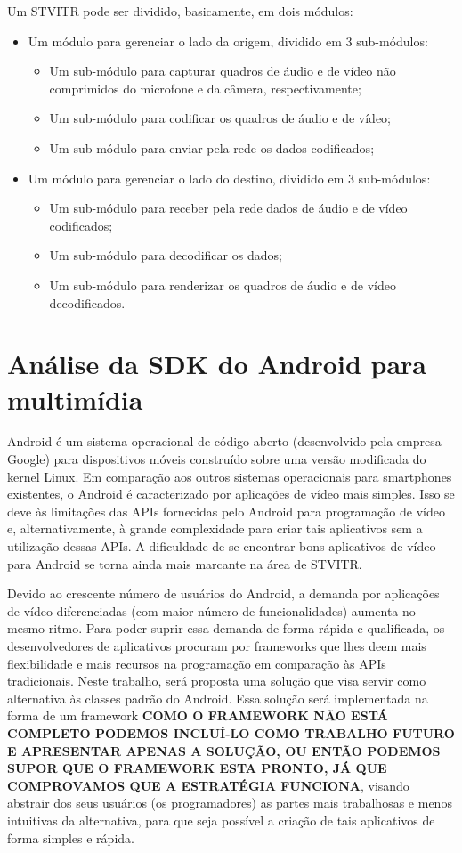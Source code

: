 \documentclass{acm_proc_article-sp}
\newcommand{\todo}[1]{\textcolor[rgb]{1.00,0.00,0.00}{\bf \uppercase{#1}}}
\begin{document}
Um STVITR pode ser dividido, basicamente, em dois módulos:
\begin{itemize}
 \item Um módulo para gerenciar o lado da origem, dividido em 3 sub-módulos:
 \begin{itemize}
  \item Um sub-módulo para capturar quadros de áudio e de vídeo não comprimidos do microfone e da câmera, respectivamente;
  \item Um sub-módulo para codificar os quadros de áudio e de vídeo;
  \item Um sub-módulo para enviar pela rede os dados codificados;
 \end{itemize}
 \item Um módulo para gerenciar o lado do destino, dividido em 3 sub-módulos:
 \begin{itemize}
  \item Um sub-módulo para receber pela rede dados de áudio e de vídeo codificados;
  \item Um sub-módulo para decodificar os dados;
  \item Um sub-módulo para renderizar os quadros de áudio e de vídeo decodificados.
 \end{itemize}
\end{itemize}

\section{Análise da SDK do Android para multimídia}

Android é um sistema operacional de código aberto (desenvolvido pela empresa Google) para dispositivos móveis construído sobre uma versão modificada do kernel Linux. Em comparação aos outros sistemas operacionais para smartphones existentes, o Android é caracterizado por aplicações de vídeo mais simples. Isso se deve às limitações das APIs fornecidas pelo Android para programação de vídeo e, alternativamente, à grande complexidade para criar tais aplicativos sem a utilização dessas APIs. A dificuldade de se encontrar bons aplicativos de vídeo para Android se torna ainda mais marcante na área de STVITR.

Devido ao crescente número de usuários do Android, a demanda por aplicações de vídeo diferenciadas (com maior número de funcionalidades) aumenta no mesmo ritmo. Para poder suprir essa demanda de forma rápida e qualificada, os desenvolvedores de aplicativos procuram por frameworks que lhes deem mais flexibilidade e mais recursos na programação em comparação às APIs tradicionais. Neste trabalho, será proposta uma solução que visa servir como alternativa às classes padrão do Android. Essa solução será implementada na forma de um framework \todo{como o framework não está completo podemos incluí-lo como trabalho futuro e apresentar apenas a solução, ou então podemos supor que o framework esta pronto, já que comprovamos que a estratégia funciona}, visando abstrair dos seus usuários (os programadores) as partes mais trabalhosas e menos intuitivas da alternativa, para que seja possível a criação de tais aplicativos de forma simples e rápida.
\end{document}
